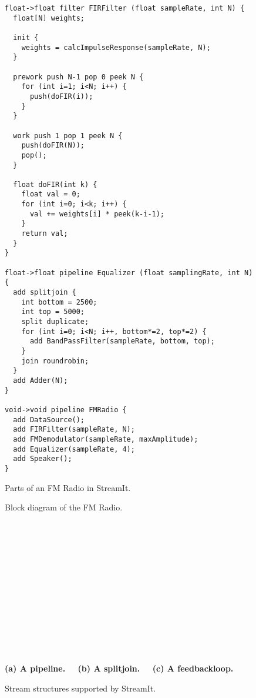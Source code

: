 \begin{figure}[t]
\scriptsize
\begin{verbatim}
float->float filter FIRFilter (float sampleRate, int N) {
  float[N] weights;

  init {
    weights = calcImpulseResponse(sampleRate, N);
  }

  prework push N-1 pop 0 peek N {
    for (int i=1; i<N; i++) {
      push(doFIR(i));
    }
  }

  work push 1 pop 1 peek N {
    push(doFIR(N));
    pop();
  }

  float doFIR(int k) {
    float val = 0;
    for (int i=0; i<k; i++) {
      val += weights[i] * peek(k-i-1);
    }
    return val;
  }
}

float->float pipeline Equalizer (float samplingRate, int N) {
  add splitjoin {
    int bottom = 2500;
    int top = 5000;
    split duplicate;
    for (int i=0; i<N; i++, bottom*=2, top*=2) {
      add BandPassFilter(sampleRate, bottom, top);
    }
    join roundrobin;
  }
  add Adder(N);
}

void->void pipeline FMRadio {
  add DataSource();
  add FIRFilter(sampleRate, N);
  add FMDemodulator(sampleRate, maxAmplitude);
  add Equalizer(sampleRate, 4);
  add Speaker();
}
\end{verbatim}
\vspace{-12pt}
\caption{\protect\small Parts of an FM Radio in StreamIt.
\protect\label{fig:radiocode}}
\vspace{-6pt}
\end{figure}

\begin{figure}[t]
\begin{center}
\hspace{0.1in}
\vspace{-36pt}
\caption{\protect\small Block diagram of the FM Radio.
\protect\label{fig:radio-ascoded}}
\vspace{10pt}
~~
\begin{minipage}{0.46in}
\centering
{} \\
\end{minipage} 
~
\begin{minipage}{1.3in}
\centering
{} \\
\end{minipage}
~
\begin{minipage}{1.02in}
\centering
{} \\
\end{minipage} 
\\ ~ \\ {\bf \protect\small (a) A pipeline. ~~(b) A splitjoin. ~~(c) A feedbackloop.}
\caption{\protect\small Stream structures supported by StreamIt.
\protect\label{fig:structures}}
\vspace{-12pt}
\end{center}
\vspace{-12pt}
\end{figure}

